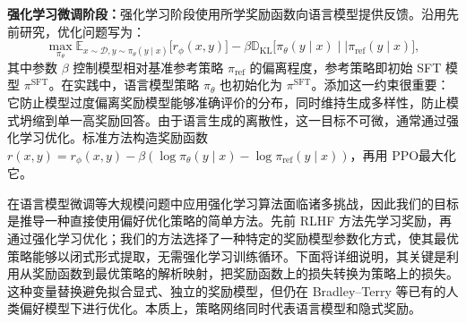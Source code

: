 \textbf{强化学习微调阶段：}强化学习阶段使用所学奖励函数向语言模型提供反馈。沿用先前研究\cite{dpo-jaques2017sequence,dpo-jaques2020human}，优化问题写为：
\begin{equation}\label{dpo-eq:RL}
\max_{\pi_{\theta}}  \mathbb{E}_{x\sim \mathcal{D}, y\sim \pi_{\theta}(y \mid x)}\bigl[r_{\phi}(x, y)\bigr] - \beta\mathbb{D}_{\textrm{KL}}\bigl[\pi_{\theta}(y\mid x)\mid \mid \pi_{\mathrm{ref}}(y\mid x)\bigr],
\end{equation}
其中参数 $\beta$ 控制模型相对基准参考策略 $\pi_{\mathrm{ref}}$ 的偏离程度，参考策略即初始 SFT 模型 $\pi^{\mathrm{SFT}}$。在实践中，语言模型策略 $\pi_\theta$ 也初始化为 $\pi^{\mathrm{SFT}}$。添加这一约束很重要：它防止模型过度偏离奖励模型能够准确评价的分布，同时维持生成多样性，防止模式坍缩到单一高奖励回答。由于语言生成的离散性，这一目标不可微，通常通过强化学习优化。标准方法\cite{dpo-ziegler2020finetuning,dpo-stiennon2022learning,dpo-bai2022training,dpo-ouyang2022training}构造奖励函数 ${r(x,y)=r_\phi(x,y)-\beta(\log\pi_\theta(y\mid x)-\log\pi_{\mathrm{ref}}(y\mid x))}$，再用 PPO\cite{dpo-schulman2017proximal}最大化它。


在语言模型微调等大规模问题中应用强化学习算法面临诸多挑战，因此我们的目标是推导一种直接使用偏好优化策略的简单方法。先前 RLHF 方法先学习奖励，再通过强化学习优化；我们的方法选择了一种特定的奖励模型参数化方式，使其最优策略能够以闭式形式提取，无需强化学习训练循环。下面将详细说明，其关键是利用从奖励函数到最优策略的解析映射，把奖励函数上的损失转换为策略上的损失。这种变量替换避免拟合显式、独立的奖励模型，但仍在 Bradley--Terry 等已有的人类偏好模型下进行优化。本质上，策略网络同时代表语言模型和隐式奖励。


